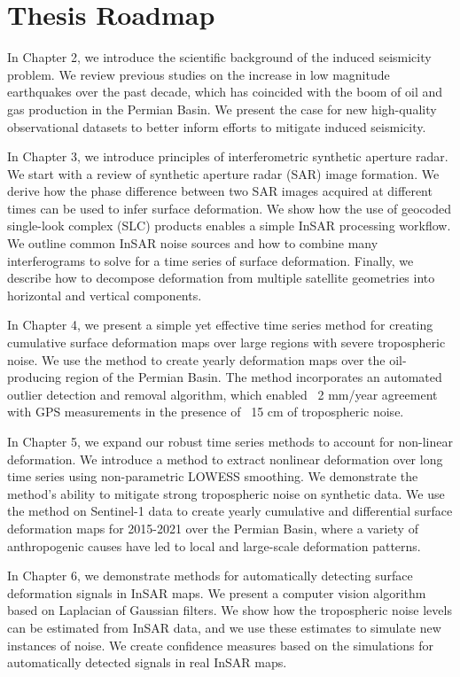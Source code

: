 \documentclass{utexasthesis}
\begin{document}
\section{Thesis Roadmap}
\label{sec:chap1-roadmap}

In Chapter 2, we introduce the scientific background of the induced seismicity problem. We review previous studies on the increase in low magnitude earthquakes over the past decade, which has coincided with the boom of oil and gas production in the Permian Basin. We present the case for new high-quality observational datasets to better inform efforts to mitigate induced seismicity.

In Chapter 3, we introduce principles of interferometric synthetic aperture radar. We start with a review of synthetic aperture radar (SAR) image formation. We derive how the phase difference between two SAR images acquired at different times can be used to infer surface deformation. We show how the use of geocoded single-look complex (SLC) products enables a simple InSAR processing workflow. We outline common InSAR noise sources and how to combine many interferograms to solve for a time series of surface deformation. Finally, we describe how to decompose deformation from multiple satellite geometries into horizontal and vertical components.


In Chapter 4, we present a simple yet effective time series method for creating cumulative surface deformation maps over large regions with severe tropospheric noise. We use the method to create yearly deformation maps over the oil-producing region of the Permian Basin. The method incorporates an automated outlier detection and removal algorithm, which enabled ~2 mm/year agreement with GPS measurements in the presence of ~15 cm of tropospheric noise.


In Chapter 5, we expand our robust time series methods to account for non-linear deformation. We introduce a method to extract nonlinear deformation over long time series using non-parametric LOWESS smoothing. We demonstrate the method's ability to mitigate strong tropospheric noise on synthetic data. We use the method on Sentinel-1 data to create yearly cumulative and differential surface deformation maps for 2015-2021 over the Permian Basin, where a variety of anthropogenic causes have led to local and large-scale deformation patterns.


In Chapter 6, we demonstrate methods for automatically detecting surface deformation signals in InSAR maps. We present a computer vision algorithm based on Laplacian of Gaussian filters. We show how the tropospheric noise levels can be estimated from InSAR data, and we use these estimates to simulate new instances of noise. We create confidence measures based on the simulations for automatically detected signals in real InSAR maps.
\end{document}
